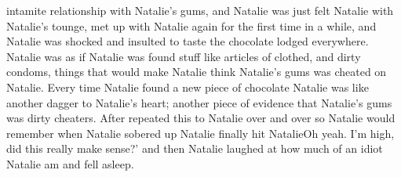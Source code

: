 \documentclass[12pt]{book}
\begin{document}
intamite relationship with Natalie's gums, and Natalie was just felt Natalie with Natalie's tounge, met up with Natalie again for the first time in a while, and Natalie was shocked and insulted to taste the chocolate lodged everywhere. Natalie was as if Natalie was found stuff like articles of clothed, and dirty condoms, things that would make Natalie think Natalie's gums was cheated on Natalie. Every time Natalie found a new piece of chocolate Natalie was like another dagger to Natalie's heart; another piece of evidence that Natalie's gums was dirty cheaters. After repeated this to Natalie over and over so Natalie would remember when Natalie sobered up Natalie finally hit NatalieOh yeah. I'm high, did this really make sense?' and then Natalie laughed at how much of an idiot Natalie am and fell asleep.
\end{document}
